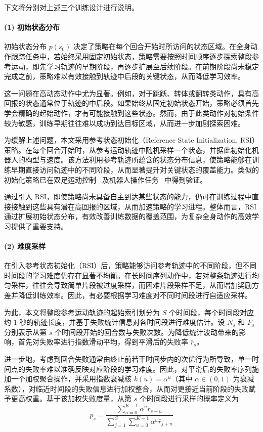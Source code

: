 下文将分别对上述三个训练设计进行说明。

\paragraph{(1) 初始状态分布}

初始状态分布 $p(s_0)$ 决定了策略在每个回合开始时所访问的状态区域。在全身动作跟踪任务中，若始终采用固定初始状态，策略需要按照时间顺序逐步探索整段参考运动，即先学习轨迹的早期阶段，再逐步扩展至后续阶段。在前期阶段尚未稳定完成之前，策略难以有效接触到轨迹中后段的关键状态，从而降低学习效率。

这一问题在高动态动作中尤为显著。例如，对于跳跃、转体或翻转类动作，具有高回报的状态通常位于轨迹的中后段。如果始终从固定初始状态开始，策略必须首先学会精确的起始动作，才有可能接触到这些状态。然而，由于此类动作对初始条件较为敏感，训练早期往往难以成功到达目标区域，从而进一步加剧探索困难。

为缓解上述问题，本文采用参考状态初始化（Reference State Initialization, RSI）策略。在每个回合开始时，从参考运动轨迹中随机采样一个状态，并据此初始化机器人的构型与速度。该方法利用参考轨迹所蕴含的状态分布信息，使策略能够在训练早期直接访问轨迹中的不同阶段，从而显著提升对关键状态的覆盖能力。类似的初始化策略已在双足运动控制~\cite{ratliff2007imitation} 及机器人操作任务~\cite{nair2018overcoming,rajeswaran2017learning} 中得到验证。

通过引入 RSI，即使策略尚未具备自主到达某些状态的能力，仍可在训练过程中直接接触到这些具有潜在高回报的区域，从而加速策略的学习进程。整体而言，RSI 通过扩展初始状态分布，有效改善训练数据的覆盖范围，为复杂全身动作的高效学习提供了重要支持。

\paragraph{(2) 难度采样}

在引入参考状态初始化（RSI）后，策略能够访问参考轨迹中的不同阶段，但不同时间段的学习难度仍存在显著不均衡。在长时间序列动作中，若对整条轨迹进行均匀采样，往往会导致简单片段被过度采样，而困难片段采样不足，从而增加奖励方差并降低训练效率。因此，有必要根据学习难度对不同时间段进行自适应采样。

为此，本文将整段参考运动轨迹的起始索引划分为 $S$ 个时间段，每个时间段对应约 $1$ 秒的轨迹长度，并基于失败统计信息对各时间段进行难度估计。设 $N_s$ 和 $F_s$ 分别表示从第 $s$ 个时间段开始的回合数与失败次数。为降低统计波动带来的影响，首先对失败率进行指数滑动平均，得到平滑后的失败率 $\bar r_s$。

进一步地，考虑到回合失败通常由终止前若干时间步内的次优行为所导致，单一时间点的失败率难以准确反映对应阶段的学习难度。因此，对平滑后的失败率序列施加一个加权聚合操作，并采用指数衰减核 $k(u)=\alpha^u$（其中 $\alpha \in (0,1)$ 为衰减系数），对临近时间段的失败信息进行加权整合，从而对更接近当前阶段的失败赋予更高权重。基于该加权失败度量，从第 $s$ 个时间段进行采样的概率定义为
\begin{equation}
	p_s=\frac{\sum_{u=0}^{K-1}\alpha^u \bar r_{s+u}}{\sum_{j=1}^{S}\sum_{u=0}^{K-1}\alpha^u \bar r_{j+u}}
\end{equation}

